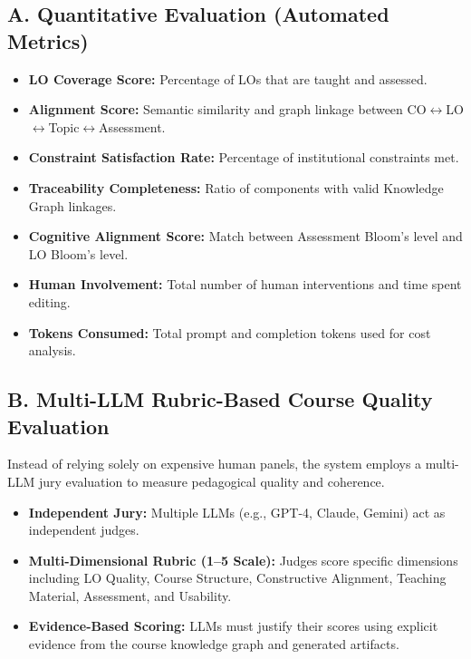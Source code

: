 \documentclass[11pt,a4paper]{article}
\begin{document}
\subsection*{A. Quantitative Evaluation (Automated Metrics)}
\begin{itemize}[nosep,leftmargin=1.5em]
\item \textbf{LO Coverage Score:} Percentage of LOs that are taught and assessed.
\item \textbf{Alignment Score:} Semantic similarity and graph linkage between CO$\leftrightarrow$LO$\leftrightarrow$Topic$\leftrightarrow$Assessment.
\item \textbf{Constraint Satisfaction Rate:} Percentage of institutional constraints met.
\item \textbf{Traceability Completeness:} Ratio of components with valid Knowledge Graph linkages.
\item \textbf{Cognitive Alignment Score:} Match between Assessment Bloom's level and LO Bloom's level.
\item \textbf{Human Involvement:} Total number of human interventions and time spent editing.
\item \textbf{Tokens Consumed:} Total prompt and completion tokens used for cost analysis.
\end{itemize}

\subsection*{B. Multi-LLM Rubric-Based Course Quality Evaluation}
Instead of relying solely on expensive human panels, the system employs a multi-LLM jury evaluation to measure pedagogical quality and coherence.
\begin{itemize}[nosep,leftmargin=1.5em]
\item \textbf{Independent Jury:} Multiple LLMs (e.g., GPT-4, Claude, Gemini) act as independent judges.
\item \textbf{Multi-Dimensional Rubric (1--5 Scale):} Judges score specific dimensions including LO Quality, Course Structure, Constructive Alignment, Teaching Material, Assessment, and Usability.
\item \textbf{Evidence-Based Scoring:} LLMs must justify their scores using explicit evidence from the course knowledge graph and generated artifacts.
\end{itemize}
\end{document}
